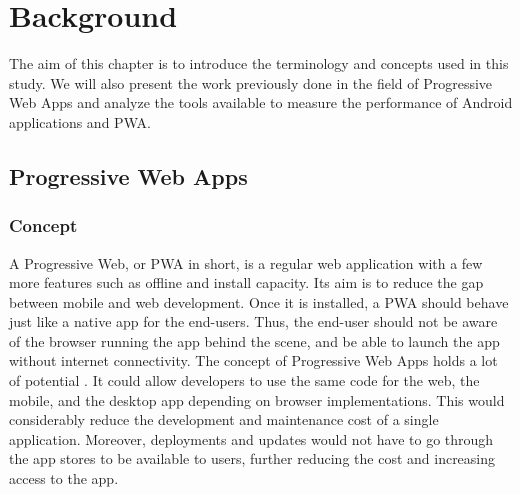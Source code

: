 \documentclass{kththesis}
\begin{document}



\chapter{Background}

The aim of this chapter is to introduce the terminology and concepts used in this study. We will also present the work previously done in the field of Progressive Web Apps and analyze the tools available to measure the performance of Android applications and PWA.

\section{Progressive Web Apps}

\subsection{Concept}

A Progressive Web, or PWA in short, is a regular web application with a few more features such as offline and install capacity. Its aim is to reduce the gap between mobile and web development. Once it is installed, a PWA should behave just like a native app for the end-users. Thus, the end-user should not be aware of the browser running the app behind the scene, and be able to launch the app without internet connectivity. \newline
The concept of Progressive Web Apps holds a lot of potential \cite{PWApossibleUnifer}. It could allow developers to use the same code for the web, the mobile, and the desktop app depending on browser implementations. This would considerably reduce the development and maintenance cost of a single application. Moreover, deployments and updates would not have to go through the app stores to be available to users, further reducing the cost and increasing access to the app.
\end{document}
